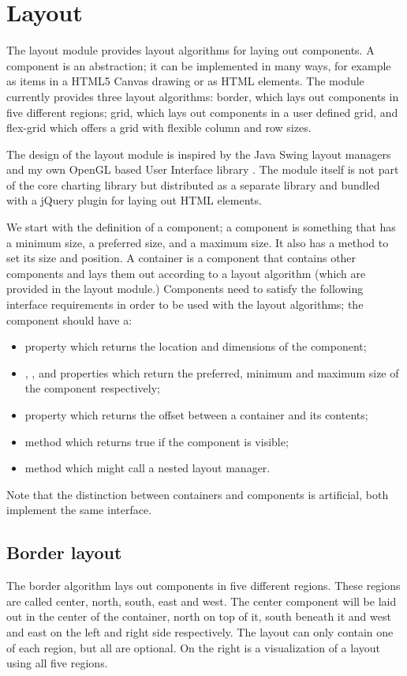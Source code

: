 \section{Layout}
The layout module provides layout algorithms for laying out components. A component is an abstraction; it can be implemented in many ways, for example as items in a HTML5 Canvas drawing or as HTML elements. The module currently provides three layout algorithms: border, which lays out components in five different regions; grid, which lays out components in a user defined grid, and flex-grid which offers a grid with flexible column and row sizes.

The design of the layout module is inspired by the Java Swing layout managers \cite{sun08} and my own OpenGL based User Interface library \cite{stein06}. The module itself is not part of the core charting library but distributed as a separate library \cite{stein08} and bundled with a jQuery plugin for laying out HTML elements.

We start with the definition of a component; a component is something that has a minimum size, a preferred size, and a maximum size. It also has a method to set its size and position. A container is a component that contains other components and lays them out according to a layout algorithm (which are provided in the layout module.) Components need to satisfy the following interface requirements in order to be used with the layout algorithms; the component should have a:
\begin{itemize}
\item {} property which returns the location and dimensions of the component;
\item {}, , and  properties which return the preferred, minimum and maximum size of the component respectively;
\item {} property which returns the offset between a container and its contents;
\item {} method which returns true if the component is visible;
\item {} method which might call a nested layout manager.
\end{itemize}

Note that the distinction between containers and components is artificial, both implement the same interface. 

\subsection{Border layout}
The border algorithm lays out components in five different regions. These regions are called center, north, south, east and west. The center component will be laid out in the center of the container, north on top of it, south beneath it and west and east on the left and right side respectively. The layout can only contain one of each region, but all are optional. On the right is a visualization of a layout using all five regions. 

